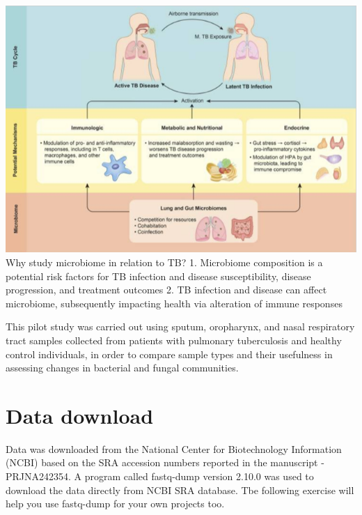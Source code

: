 \documentclass[
]{book}
\begin{document}
\includegraphics[width=1\textwidth,height=\textheight]{./QIIMEpics/lyx.qiime.png}
Why study microbiome in relation to TB?
1. Microbiome composition is a potential risk factors for TB infection and disease susceptibility, disease progression,
and treatment outcomes
2. TB infection and disease can affect microbiome, subsequently impacting health via alteration of immune responses

This pilot study was carried out using sputum, oropharynx, and nasal respiratory tract samples collected from patients
with pulmonary tuberculosis and healthy control individuals, in order to compare sample types and their usefulness in
assessing changes in bacterial and fungal communities.

\hypertarget{data-download}{%
\section{Data download}\label{data-download}}

Data was downloaded from the National Center for Biotechnology Information (NCBI) based on the SRA accession
numbers reported in the manuscript - PRJNA242354.
A program called fastq-dump version 2.10.0 was used to download the data directly from NCBI SRA database. Tbe
following exercise will help you use fastq-dump for your own projects too.
\end{document}
